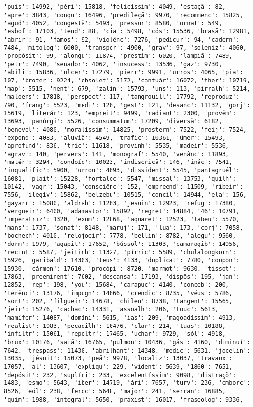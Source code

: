 \documentclass[11pt]{article}
\begin{document}
\begin{Verbatim}[commandchars=\\\{\}]
'puis': 14992, 'péri': 15818, 'felicíssim': 4049, 'estaçã': 82, 'apre': 3843, 'conqu': 16496, 'predileçã': 9970, 'recommenc': 15825, 'agud': 4052, 'congestã': 5493, 'pressur': 8580, 'ornat': 549, 'esbof': 17103, 'tend': 88, 'cia': 5498, 'cós': 15536, 'brasã': 12981, 'abrir': 91, 'famos': 92, 'violênc': 7276, 'pedicur': 94, 'cadern': 7484, 'mitolog': 6000, 'transpor': 4900, 'grav': 97, 'soleniz': 4060, 'propósit': 99, 'alongu': 11874, 'prestim': 6020, 'lampiã': 7489, 'petr': 7490, 'senador': 4062, 'insucess': 13536, 'gaz': 9730, 'abíli': 15836, 'ulcer': 17279, 'pierr': 9991, 'urros': 4065, 'pia': 107, 'broter': 9224, 'obsolet': 5172, 'cantuár': 16072, 'ther': 10719, 'map': 5515, 'ment': 679, 'zalin': 15793, 'uns': 113, 'pirralh': 5214, 'maloens': 17818, 'perspect': 117, 'tangrouill': 17792, 'reproduz': 790, 'frang': 5523, 'medi': 120, 'gest': 121, 'desanc': 11132, 'gorj': 15619, 'literár': 123, 'empreit': 9499, 'radiant': 2300, 'provêm': 13693, 'panúrgi': 5526, 'consummatum': 17209, 'diversã': 6182, 'benevol': 4080, 'moralíssim': 14825, 'prostern': 7522, 'feij': 7524, 'expond': 4083, 'aluviã': 4549, 'trafic': 10361, 'úmer': 15493, 'aprofund': 836, 'tric': 11618, 'provinh': 5535, 'madeir': 5536, 'agrav': 140, 'pervers': 141, 'monograf': 5540, 'venânc': 11893, 'matér': 3294, 'condoíd': 10023, 'indiscriçã': 146, 'inác': 7541, 'inqualific': 5900, 'urrou': 4093, 'dissident': 5545, 'pantagruél': 16081, 'plait': 15228, 'fortalec': 5547, 'missal': 13753, 'quilh': 10142, 'vagr': 15043, 'consciênc': 152, 'empreend': 11509, 'ribeir': 7556, 'ilegív': 15862, 'belzebu': 10515, 'concil': 14944, 'ela': 156, 'gayarr': 15080, 'aldrab': 11203, 'jesuin': 12923, 'refug': 17380, 'vergueir': 6400, 'adamastor': 15892, 'regret': 14884, '46': 10791, 'imperatriz': 1320, 'exum': 12868, 'aquarel': 12523, 'labéu': 5570, 'mans': 1737, 'sonat': 8148, 'maruj': 171, 'lua': 173, 'corj': 7058, 'bochech': 4010, 'relojoeir': 7778, 'bellin': 8782, 'alegu': 9560, 'dorm': 1979, 'agapit': 17652, 'bússol': 11303, 'camaragib': 14956, 'recint': 5587, 'jeitinh': 11327, 'pírric': 5589, 'chulalongkorn': 15926, 'garibald': 14303, 'teus': 4133, 'duplicat': 7780, 'coupon': 15930, 'cármen': 17610, 'procópi': 8720, 'marmot': 9630, 'tissot': 17863, 'preeminent': 7602, 'descansa': 17193, 'dispôs': 195, 'jan': 12852, 'rep': 198, 'you': 15684, 'carapuc': 4140, 'conceb': 200, 'terênci': 13176, 'impugn': 14066, 'crendic': 8735, 'véus': 5786, 'sort': 202, 'filgueir': 14678, 'chilen': 8738, 'tangent': 15565, 'jeir': 15276, 'cachac': 14331, 'assoalh': 206, 'touc': 5613, 'mamífer': 14087, 'domíni': 5615, 'ias': 209, 'magoadíssim': 4913, 'realist': 1983, 'pecadilh': 10476, 'clar': 214, 'tuas': 10188, 'infiltr': 15061, 'repoltr': 17465, 'uchar': 9729, 'sól': 4918, 'brux': 10176, 'saiã': 16765, 'pulmon': 10436, 'gás': 4160, 'diminuí': 7642, 'trespass': 11430, 'abrilhant': 14348, 'medic': 5631, 'jocelin': 13035, 'jésuit': 15073, 'peã': 9978, 'localiz': 13037, 'travaux': 17057, 'al': 13607, 'expliqu': 229, 'vident': 5639, '1860': 7651, 'depósit': 232, 'suplíci': 233, 'excelentíssim': 9098, 'distraçõ': 1483, 'esmo': 5643, 'iber': 14719, 'ári': 7657, 'turv': 236, 'emborc': 8526, 'eól': 238, 'feroc': 5648, 'major': 241, 'serran': 16885, 'quim': 1988, 'integral': 5650, 'praxist': 16017, 'fraseolog': 9336, 
\end{Verbatim}
\end{document}
